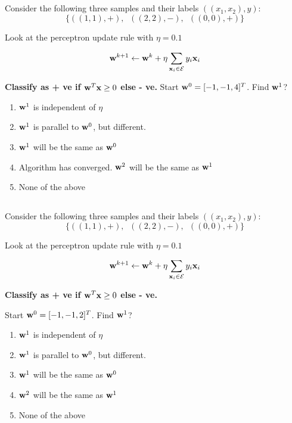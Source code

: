 \begin{frame}
\section{}
Consider the following three samples and their labels $((x_1, x_2), y)$:
\[ \{ ((1,1), +),\,\,\ ((2,2), -),\,\,\,  ((0,0),+) \}\]

Look at the perceptron update rule with $\eta = 0.1$

\[ {\bf w}^{k+1}\leftarrow {\bf w}^k + \eta \sum_{{\bf x}_i \in {\cal E}}y_i {\bf x}_i \]

{\bf Classify as + ve if ${\bf w}^T{\bf x} \geq 0$ else - ve.}
Start ${\bf w}^0 = [-1,-1,4]^T $.  Find ${\bf w}^1$?
    \begin{enumerate}[label=(\Alph*)]
      \item ${\bf w}^1$ is independent of $\eta$
          \item ${\bf w}^1$ is parallel to ${\bf w}^0$, but different.
          \item ${\bf w}^1$ will be the same as ${\bf w}^0$
          \item Algorithm has converged. ${\bf w}^2$ will be the same as ${\bf w}^1$
          \item None of the above   %
    \end{enumerate}
\end{frame}

\begin{frame}
\section{}
Consider the following three samples and their labels $((x_1, x_2), y)$:
\[ \{ ((1,1), +),\,\,\ ((2,2), -),\,\,\,  ((0,0),+) \}\]

Look at the perceptron update rule with $\eta = 0.1$

\[ {\bf w}^{k+1}\leftarrow {\bf w}^k + \eta \sum_{{\bf x}_i \in {\cal E}}y_i {\bf x}_i \]

{\bf Classify as + ve if ${\bf w}^T{\bf x} \geq 0$ else - ve.}

  Start ${\bf w}^0 = [-1,-1, 2]^T $.  Find  ${\bf w}^1$?
     \begin{enumerate}[label=(\Alph*)]
       \item ${\bf w}^1$ is independent of $\eta$
      \item ${\bf w}^1$ is parallel to ${\bf w}^0$, but different.
      \item ${\bf w}^1$ will be the same as ${\bf w}^0$
      \item ${\bf w}^2$ will be the same as ${\bf w}^1$
      \item None of the above   %
     \end{enumerate}
\end{frame}


